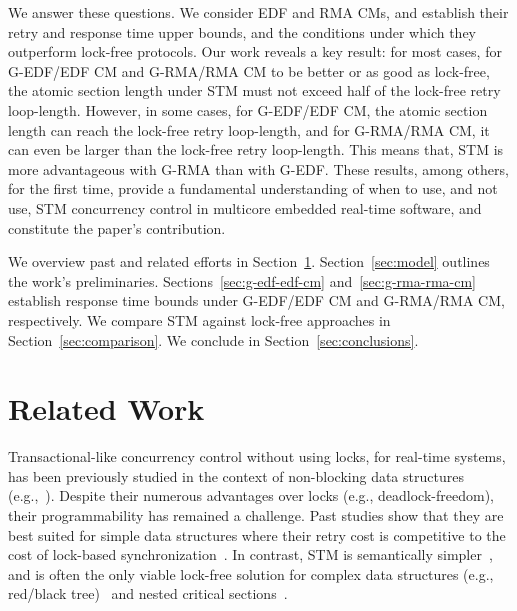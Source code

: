 \documentclass{sig-alternate}
\begin{document}
We answer these questions. We consider EDF and RMA CMs, and establish their retry and response time upper bounds, and the conditions under which they outperform lock-free protocols. Our work reveals a key result: for most cases, for G-EDF/EDF CM and G-RMA/RMA CM to be better or as good as lock-free, the atomic section length under STM must not exceed half of the lock-free retry loop-length. However, in some cases, for G-EDF/EDF CM, the atomic section length can reach the lock-free retry loop-length, and for G-RMA/RMA CM, it can even be larger than the lock-free retry loop-length.  This means that, STM is more advantageous with G-RMA than with G-EDF.
These results, among others, for the first time, provide a
fundamental understanding of when to use, and not use, STM concurrency
control in multicore embedded real-time software, and constitute the
paper's contribution. 

We overview past and related efforts in Section~\ref{sec:past}. Section~\ref{sec:model} outlines the work's preliminaries. Sections~\ref{sec:g-edf-edf-cm} and~\ref{sec:g-rma-rma-cm}
establish response time bounds under G-EDF/EDF CM and G-RMA/RMA CM, 
respectively. We compare STM against lock-free approaches in Section~\ref{sec:comparison}. We conclude in Section~\ref{sec:conclusions}.
\section*{}
\section{Related Work}
\label{sec:past}

Transactional-like concurrency control without using locks, for real-time systems, has been previously studied in the context of non-blocking data structures (e.g.,~\cite{anderson95realtime}). Despite their numerous advantages over locks 
(e.g., deadlock-freedom), 
their programmability has remained a challenge. 
Past studies show that they are best suited for simple data structures where their retry cost is competitive to the cost of lock-based synchronization~\cite{bc+08}.  In contrast, STM is semantically simpler~\cite{Herlihy:2006:AMP:1146381.1146382}, and is often the only viable lock-free solution for complex data structures (e.g., red/black tree)~\cite{key-1} and nested critical sections~\cite{Saha:2006:MHP:1122971.1123001}.
\end{document}
